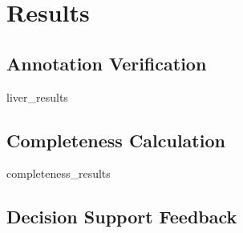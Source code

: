 \chapter{Results}

\section{Annotation Verification}
{liver_results}

\section{Completeness Calculation}
{completeness_results}

\section{Decision Support Feedback}
